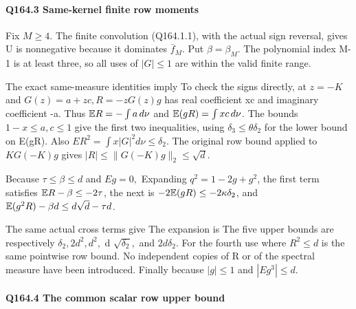 \paragraph{Q164.3 Same-kernel finite row moments}

Fix \(M\ge 4.\) The finite convolution (Q164.1.1), with the actual sign reversal,
gives
U is nonnegative because it dominates \(\bar f_{M}.\) Put \(\beta=\beta_M.\)
The polynomial index M-1 is at least three, so all uses of \(|G|\le 1\)
are within the valid finite range.

The exact same-measure identities imply
To check the signs directly, at \(z=-K\) and \(G(z)=a+zc,\allowbreak  R=-zG(z)g\) has real coefficient xc and imaginary coefficient -a.
Thus \(\mathbb E R=-\int a\,d\nu\) and \(\mathbb E(gR)=\int xc\,d\nu\).
The bounds \(1-x\le a,c\le1\) give the first two inequalities, using
\(\delta_3\le \theta \delta_2\) for the lower bound on E(gR).
Also \(ER^2=\int  x|G|^2 d\nu\le \delta_2.\) The original row bound applied
to \(KG(-K)g\) gives \(|R|\le\|G(-K)g\|_2\le\sqrt d\).

Because \(\tau\le \beta\le d\) and \(Eg=0,\allowbreak \)
Expanding \(q^2=1-2g+g^2\), the first term satisfies
\(\mathbb E R-\beta\le-2\tau\), the next is
\(-2\mathbb E(gR)\le-2\kappa\delta_2\), and
\(\mathbb E(g^2R)-\beta d\le d\sqrt d-\tau d\).

The same actual cross terms give
The expansion is
The five upper bounds are respectively \(\delta_2,\allowbreak  2d^2,\allowbreak  d^2,\allowbreak \)
d \(\sqrt{\delta_2},\allowbreak \) and \(2d\delta_2.\) For the fourth use
where \(R^2\le d\) is the same pointwise row bound. No independent copies
of R or of the spectral measure have been introduced.
Finally
because \(|g|\le 1\) and \(|Eg^3|\le d.\)

\paragraph{Q164.4 The common scalar row upper bound}

